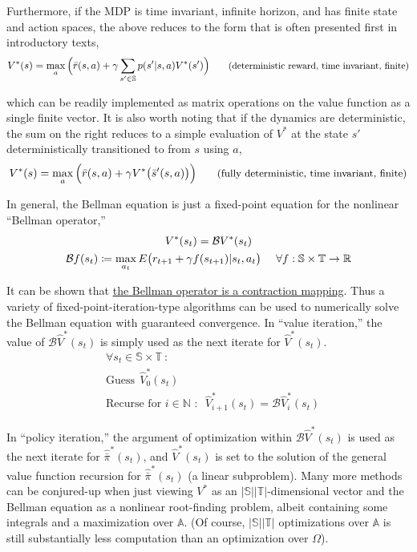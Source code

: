 Furthermore, if the MDP is time invariant, infinite horizon, and has finite state and action spaces, the above reduces to the form that is often presented first in introductory texts,
\begin{equation*}
V^*(s) = \max_{a} \Big{(} \bar{r}(s, a) + \gamma \sum_{s' \in \mathbb{S}} p(s'|s,a) V^*(s') \Big{)} \small{\tag{deterministic reward, time invariant, finite}}
\end{equation*}

which can be readily implemented as matrix operations on the value function as a single finite vector. It is also worth noting that if the dynamics are deterministic, the sum on the right reduces to a simple evaluation of $V^*$ at the state $s'$ deterministically transitioned to from $s$ using $a$,
\begin{equation*}
V^*(s) = \max_{a} \Big{(} \bar{r}(s, a) + \gamma V^*\big{(}\bar{s}'(s, a)\big{)} \Big{)} \small{\tag{fully deterministic, time invariant, finite}}
\end{equation*}

In general, the Bellman equation is just a fixed-point equation for the nonlinear ``Bellman operator,''
\begin{gather*}
V^*(s_t) = \mathcal{B}V^*(s_t)\\
\mathcal{B} f(s_t) \coloneqq \max_{a_t} E\big{(}r_{t+1} + \gamma f(s_{t+1}) | s_t, a_t\big{)}\ \ \ \ \forall f : \mathbb{S} \times \mathbb{T} \to \mathbb{R}
\end{gather*}

It can be shown that \href{https://people.eecs.berkeley.edu/~ananth/223Spr07/ee223_spr07_lec19.pdf}{the Bellman operator is a contraction mapping}. Thus a variety of fixed-point-iteration-type algorithms can be used to numerically solve the Bellman equation with guaranteed convergence. In ``value iteration,'' the value of $\mathcal{B}\hat{V}^*(s_t)$ is simply used as the next iterate for $\hat{V}^*(s_t)$.
\begin{align*}
&\forall s_t \in {\mathbb{S} \times \mathbb{T}}\ :\\
&\text{Guess}\ \ \hat{V}^*_0(s_t)\\
&\text{Recurse for $i \in \mathbb{N}$\ :}\ \ \ \hat{V}^*_{i+1}(s_t) = \mathcal{B}\hat{V}^*_i(s_t)
\end{align*}

In ``policy iteration,'' the argument of optimization within $\mathcal{B}\hat{V}^*(s_t)$ is used as the next iterate for $\hat{\bar{\pi}}^*(s_t)$, and $\hat{V}^*(s_t)$ is set to the solution of the general value function recursion for $\hat{\bar{\pi}}^*(s_t)$ (a linear subproblem). Many more methods can be conjured-up when just viewing $V^*$ as an $|\mathbb{S}||\mathbb{T}|$-dimensional vector and the Bellman equation as a nonlinear root-finding problem, albeit containing some integrals and a maximization over $\mathbb{A}$. (Of course, $|\mathbb{S}||\mathbb{T}|$ optimizations over $\mathbb{A}$ is still substantially less computation than an optimization over $\Omega$).\\

